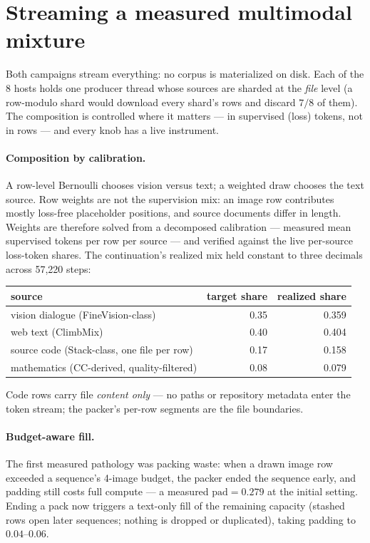 \section{Streaming a measured multimodal mixture}
\label{sec:vision-data}

Both campaigns stream everything: no corpus is materialized on disk.
Each of the 8 hosts holds one producer thread whose sources are sharded
at the \emph{file} level (a row-modulo shard would download every
shard's rows and discard $7/8$ of them). The composition is controlled
where it matters --- in supervised (loss) tokens, not in rows --- and
every knob has a live instrument.

\paragraph{Composition by calibration.} A row-level Bernoulli chooses
vision versus text; a weighted draw chooses the text source. Row
weights are not the supervision mix: an image row contributes mostly
loss-free placeholder positions, and source documents differ in length.
Weights are therefore solved from a decomposed calibration --- measured
mean supervised tokens per row per source --- and verified against the
live per-source loss-token shares. The continuation's realized mix held
constant to three decimals across 57{,}220 steps:

\begin{center}
\begin{tabular}{lrr}
\toprule
source & target share & realized share \\
\midrule
vision dialogue (FineVision-class) & 0.35 & 0.359 \\
web text (ClimbMix) & 0.40 & 0.404 \\
source code (Stack-class, one file per row) & 0.17 & 0.158 \\
mathematics (CC-derived, quality-filtered) & 0.08 & 0.079 \\
\bottomrule
\end{tabular}
\end{center}

Code rows carry file \emph{content only} --- no paths or repository
metadata enter the token stream; the packer's per-row segments are the
file boundaries.

\paragraph{Budget-aware fill.} The first measured pathology was
packing waste: when a drawn image row exceeded a sequence's 4-image
budget, the packer ended the sequence early, and padding still costs
full compute --- a measured \(\mathrm{pad}=0.279\) at the initial
setting. Ending a pack now triggers a text-only fill of the remaining
capacity (stashed rows open later sequences; nothing is dropped or
duplicated), taking padding to \(0.04\)--\(0.06\).

